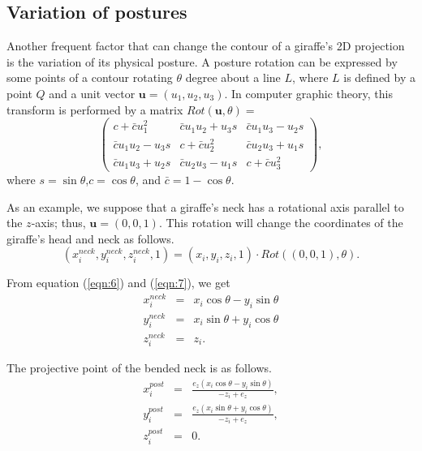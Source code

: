 \documentclass[journal]{IEEEtran}
\begin{document}
\subsection{Variation of postures}

Another frequent factor that can change the contour of a giraffe's 2D projection is the variation of its physical posture. 
A posture rotation can be expressed by some points of a contour rotating $\theta$ degree about a line $L$, 
where $L$ is defined by a point $Q$ and a unit vector $\mathbf{u}=(u_1,u_2,u_3)$. 
In computer graphic theory, this transform is performed by a matrix $Rot(\mathbf{u},\theta)=$
\begin{equation}
\left(
\begin{array}{ccc}
 c+\bar{c}u_1^2 
& \bar{c}u_1 u_2+u_3 s 
& \bar{c}u_1 u_3-u_2 s \\
 \bar{c}u_1 u_2-u_3 s 
& c+\bar{c}u_2^2 
& \bar{c}u_2 u_3+u_1 s \\
 \bar{c}u_1 u_3+u_2 s 
& \bar{c}u_2 u_3-u_1 s 
& c+\bar{c}u_3^2
\end{array}\right),
\label{eqn:6}
\end{equation} 
where $s=\sin\theta$,$c=\cos\theta$, and $\bar{c}=1-\cos\theta$.

As an example, we suppose that a giraffe's neck has a rotational axis parallel to the $z$-axis; 
thus, $\mathbf{u} = (0,0,1)$. 
This rotation will change the coordinates of the giraffe's head and neck as follows.
\begin{equation}
(x_i^{neck},y_i^{neck},z_i^{neck},1)=(x_i,y_i,z_i,1)\cdot Rot((0,0,1),\theta).
\label{eqn:7}
\end{equation}

From equation (\ref{eqn:6}) and (\ref{eqn:7}), we get
\begin{eqnarray}
x_i^{neck}&=&x_i\cos\theta-y_i\sin\theta\nonumber\\
y_i^{neck}&=&x_i\sin\theta+y_i\cos\theta\nonumber\\
z_i^{neck}&=&z_i.
\end{eqnarray}

The projective point of the bended neck is as follows.
\begin{eqnarray}
x_i^{post}&=&\frac{e_z(x_i\cos\theta-y_i\sin\theta)}{-z_i+e_z}, \nonumber\\
y_i^{post}&=&\frac{e_z(x_i\sin\theta+y_i\cos\theta)}{-z_i+e_z}, \nonumber\\
z_i^{post}&=&0.
\label{eqn:9}
\end{eqnarray}
\end{document}
